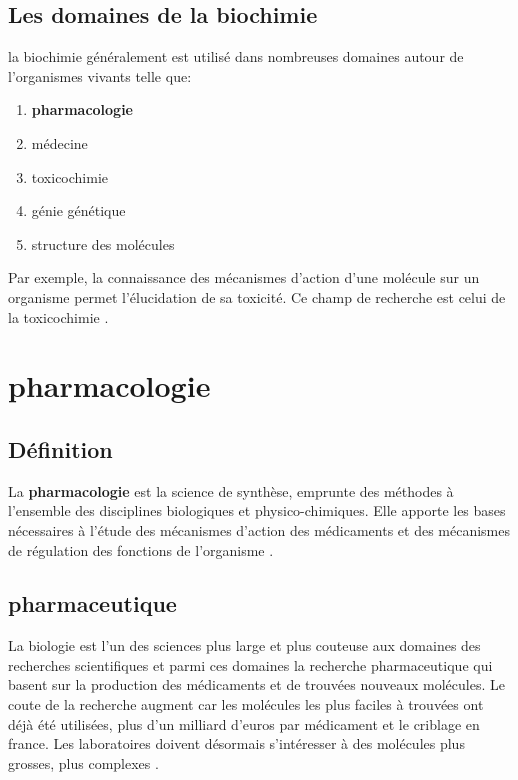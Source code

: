 \documentclass[12pt]{report}
\begin{document}
\subsection{Les domaines de la biochimie}
la biochimie généralement est utilisé dans nombreuses domaines autour de l'organismes vivants telle que:
\begin{enumerate}
\item \textbf{pharmacologie} 
\item médecine
\item toxicochimie
\item génie génétique
\item structure des molécules
\end{enumerate}
Par exemple, la connaissance des mécanismes d'action d'une molécule sur un organisme permet l'élucidation de sa toxicité. Ce champ de recherche est celui de la toxicochimie  \cite{ref6} .

\section{pharmacologie}


\subsection{Définition}
La \textbf{pharmacologie} est la science de synthèse, emprunte des méthodes à l'ensemble des disciplines biologiques et physico-chimiques. Elle apporte les bases nécessaires à l'étude des mécanismes d'action des médicaments et des mécanismes de régulation des fonctions de l'organisme \cite{ref7}.
\subsection{pharmaceutique}
La biologie est l'un des sciences plus large et plus couteuse aux domaines des recherches scientifiques et parmi ces domaines la recherche pharmaceutique qui basent sur la production des médicaments et de trouvées nouveaux molécules. Le coute de la recherche augment car les molécules les plus faciles à trouvées ont déjà été utilisées, plus d'un milliard d'euros par médicament et le criblage en france. Les laboratoires doivent désormais s'intéresser à des molécules plus grosses, plus complexes \cite{ref7} .
\end{document}
